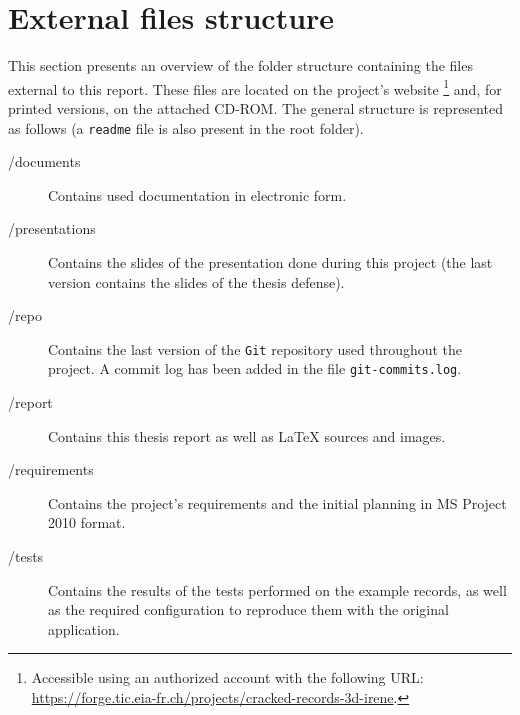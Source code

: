 
\chapter{External files structure}
\label{chap:arch-content}

This section presents an overview of the folder structure containing the files external to this report. These files are located on the project's website \footnote{Accessible using an authorized account with the following URL: \url{https://forge.tic.eia-fr.ch/projects/cracked-records-3d-irene}.} and, for printed versions, on the attached CD-ROM. The general structure is represented as follows (a \texttt{readme} file is also present in the root folder).

\begin{description}
\item[/documents] Contains used documentation in electronic form.
\item[/presentations] Contains the slides of the presentation done during this project (the last version contains the slides of the thesis defense).
\item[/repo] Contains the last version of the \texttt{Git} repository used throughout the project. A commit log has been added in the file \texttt{git-commits.log}.
\item[/report] Contains this thesis report as well as \LaTeX{} sources and images.
\item[/requirements] Contains the project's requirements and the initial planning in MS Project 2010 format.
\item[/tests] Contains the results of the tests performed on the example records, as well as the required configuration to reproduce them with the original application.
\end{description}
